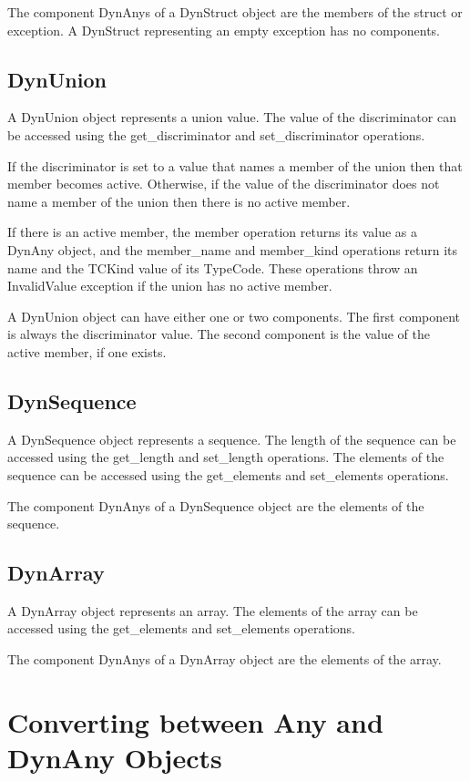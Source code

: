 \documentclass[12pt]{scrbook}
\begin{document}
The component DynAnys of a DynStruct object are the members of the
struct or exception.  A DynStruct representing an empty exception has
no components.

\subsection{DynUnion}

A DynUnion object represents a union value.  The value of the
discriminator can be accessed using the get\_discriminator and
set\_discriminator operations.

If the discriminator is set to a value that names a member of the
union then that member becomes active.  Otherwise, if the value of
the discriminator does not name a member of the union then there is
no active member.

If there is an active member, the member operation returns its value
as a DynAny object, and the member\_name and member\_kind operations
return its name and the TCKind value of its TypeCode.  These
operations throw an InvalidValue exception if the union has no active
member.

A DynUnion object can have either one or two components.  The first
component is always the discriminator value.  The second component is
the value of the active member, if one exists.

\subsection{DynSequence}

A DynSequence object represents a sequence.  The length of the
sequence can be accessed using the get\_length and set\_length
operations.  The elements of the sequence can be accessed using the
get\_elements and set\_elements operations.

The component DynAnys of a DynSequence object are the elements of the
sequence.

\subsection{DynArray}

A DynArray object represents an array.  The elements of the array can
be accessed using the get\_elements and set\_elements operations.

The component DynAnys of a DynArray object are the elements of the
array.

\section{Converting between Any and DynAny Objects}
\end{document}
